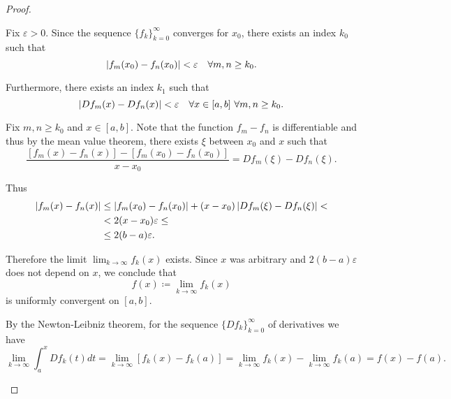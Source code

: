 \begin{proof}\mbox{}
  \begin{description}
     Fix \( \varepsilon > 0 \). Since the sequence \( \{ f_k \}_{k=0}^\infty \) converges for \( x_0 \), there exists an index \( k_0 \) such that
    \begin{equation*}
      \left\vert f_m(x_0) - f_n(x_0) \right\vert < \varepsilon \quad\forall m, n \geq k_0.
    \end{equation*}

    Furthermore, there exists an index \( k_1 \) such that
    \begin{equation*}
      \left\vert D f_m(x) - D f_n(x) \right\vert < \varepsilon \quad\forall x \in [a, b] \ \forall m, n \geq k_0.
    \end{equation*}

    Fix \( m, n \geq k_0 \) and \( x \in [a, b] \). Note that the function \( f_m - f_n \) is differentiable and thus by the mean value theorem, there exists \( \xi \) between \( x_0 \) and \( x \) such that
    \begin{equation*}
      \frac {[f_m(x) - f_n(x)] - [f_m(x_0) - f_n(x_0)]} {x - x_0} = D f_m(\xi) - D f_n(\xi).
    \end{equation*}

    Thus
    \begin{align*}
      \left\vert f_m(x) - f_n(x) \right\vert
      &\leq
      \left\vert f_m(x_0) - f_n(x_0) \right\vert + (x - x_0)\left\vert D f_m(\xi) - D f_n(\xi) \right\vert
      < \\ &<
      2 (x - x_0) \varepsilon
      \leq \\ &\leq
      2 (b - a) \varepsilon.
    \end{align*}

    Therefore the limit \( \lim_{k\to\infty} f_k(x) \) exists. Since \( x \) was arbitrary and \( 2 (b - a) \varepsilon \) does not depend on \( x \), we conclude that
    \begin{equation*}
      f(x) \coloneqq \lim_{k\to\infty} f_k(x)
    \end{equation*}
    is uniformly convergent on \( [a, b] \).

    By the Newton-Leibniz theorem, for the sequence \( \{ D f_k \}_{k=0}^\infty \) of derivatives we have
    \begin{equation*}
      \lim_{k \to \infty} \int_a^x D f_k(t) dt
      =
      \lim_{k \to \infty} [f_k(x) - f_k(a)]
      =
      \lim_{k \to \infty} f_k(x) - \lim_{k \to \infty} f_k(a)
      =
      f(x) - f(a).
    \end{equation*}


\end{description}
\end{proof}

